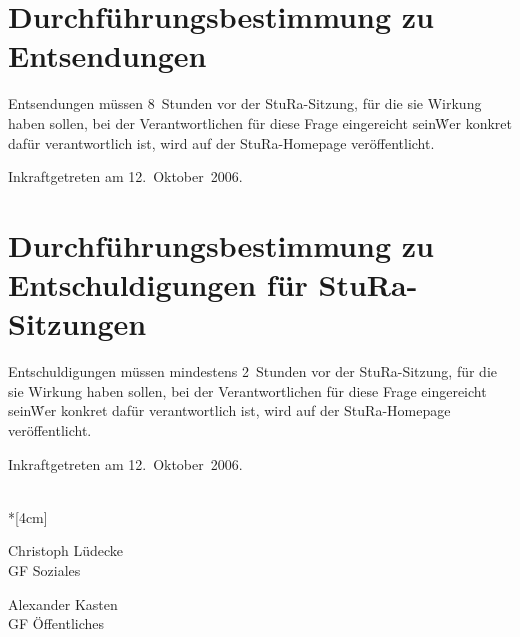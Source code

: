 \setcounter{section}{0} %
\begin{multicols}{2}
 

\section{Durchführungsbestimmung zu Entsendungen}

\setcounter{sentence}{0}

\Satz Entsendungen müssen 8~Stunden vor der StuRa-Sitzung, für die sie Wirkung haben sollen, bei der Verantwortlichen für diese Frage eingereicht sein\. Wer konkret dafür verantwortlich ist, wird auf der StuRa-Homepage veröffentlicht.


\nopagebreak
\vspace{1cm}
Inkraftgetreten am 12.~Oktober~2006.
\\


\section{Durchführungsbestimmung zu Entschuldigungen für StuRa-Sitzungen}

\setcounter{sentence}{0}

\Satz Entschuldigungen müssen mindestens 2~Stunden vor der StuRa-Sitzung, für die sie Wirkung haben sollen, bei der Verantwortlichen für diese Frage eingereicht sein\. Wer konkret dafür verantwortlich ist, wird auf der StuRa-Homepage veröffentlicht.

\nopagebreak
\vspace{1cm}
Inkraftgetreten am 12.~Oktober~2006.
\\


\end{multicols}


\normalsize
~\\*[4cm]
\begin{center}
\hspace*{\fill}
\parbox{7cm}{Christoph Lüdecke\\GF Soziales}
\hfill\parbox{7cm}{Alexander Kasten\\GF Öffentliches}
\hspace*{\fill}
\end{center}